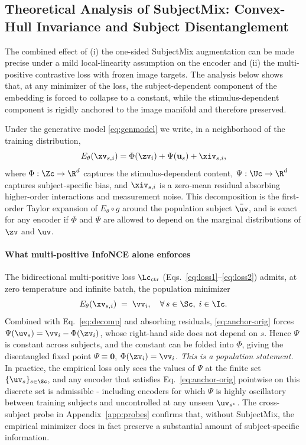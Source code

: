 \subsection{Theoretical Analysis of SubjectMix: Convex-Hull Invariance and Subject Disentanglement}
\label{sec:ana_subjectmix}

The combined effect of (i) the one-sided SubjectMix augmentation can be made
precise under a mild local-linearity assumption on the encoder and (ii) the multi-positive contrastive loss with frozen
image targets. The
analysis below shows that, at any minimizer of the loss, the
subject-dependent component of the embedding is forced to collapse to a
constant, while the stimulus-dependent component is rigidly anchored to
the image manifold and therefore preserved.

Under the generative model \eqref{eq:genmodel} we write, in a
neighborhood of the training distribution,
\begin{equation}\label{eq:decomp}
    E_\theta(\xv_{s,i})=\Phi(\zv_i)+\Psi(\mathbf{u}_s)+\xiv_{s,i},
\end{equation}
where $\Phi: \Zc \to\R^{d}$ captures the
stimulus-dependent content, $\Psi:\Uc\to\R^{d}$ captures
subject-specific bias, and $\xiv_{s,i}$ is a zero-mean residual absorbing higher-order interactions and measurement noise. This decomposition is the first-order Taylor expansion of $E_\theta\circ g$ around the population subject
$\bar{\uv}$, and is exact for any encoder if $\Phi$ and $\Psi$
are allowed to depend on the marginal distributions of
$\zv$ and $\uv$.
\paragraph{What multi-positive InfoNCE alone enforces}
The bidirectional multi-positive loss
$\Lc_{\mathrm{ctr}}$ (Eqs.~\eqref{eq:loss1}--\eqref{eq:loss2})
admits, at zero temperature and infinite batch, the population minimizer
\begin{equation}
    E_\theta(\xv_{s,i})\;=\;\vv_i,
    \quad\forall\,s\in\Sc,\;i\in\Ic.
    \label{eq:anchor-orig}
\end{equation}
Combined with Eq.~\eqref{eq:decomp} and absorbing residuals,
\eqref{eq:anchor-orig} forces
$\Psi(\uv_s)=\vv_i-\Phi(\zv_i)$, whose right-hand
side does not depend on $s$. Hence $\Psi$ is constant across subjects,
and the constant can be folded into $\Phi$, giving the disentangled
fixed point $\Psi\equiv\mathbf{0}$, $\Phi(\zv_i)=\vv_i$.
\emph{This is a population statement.} In practice, the empirical loss
only sees the values of $\Psi$ at the finite set
$\{\uv_s\}_{s\in\Sc}$, and any encoder that satisfies
Eq.~\eqref{eq:anchor-orig} pointwise on this discrete set is admissible
- including encoders for which $\Psi$ is highly oscillatory between
training subjects and uncontrolled at any unseen $\uv_{s^\star}$.
The cross-subject probe in Appendix~\ref{app:probes} confirms that, without
SubjectMix, the empirical minimizer does in fact preserve a substantial
amount of subject-specific information.

